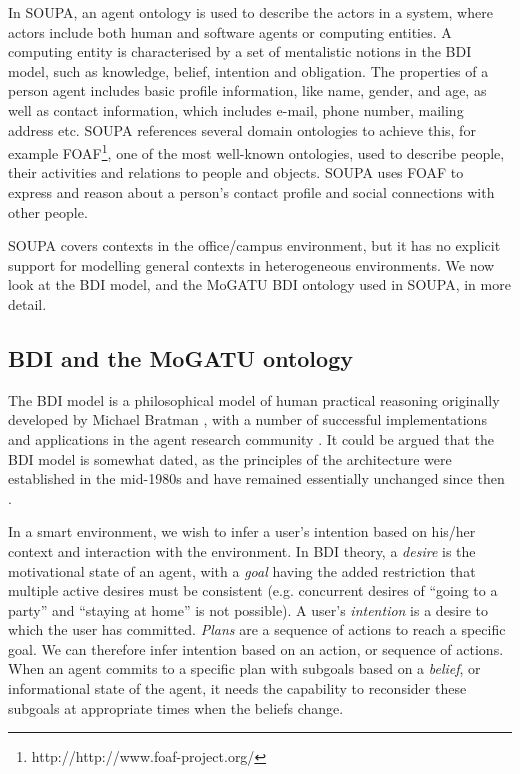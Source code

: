 In \ac{SOUPA}, an agent ontology is used to describe the actors in a system, where actors include both human and software agents or computing entities. A computing entity is characterised by a set of mentalistic notions in the \ac{BDI} model, such as knowledge, belief, intention and obligation. The properties of a person agent includes basic profile information, like name, gender, and age, as well as contact information, which includes e-mail, phone number, mailing address etc. \ac{SOUPA} references several domain ontologies to achieve this, for example \ac{FOAF}\footnote{http://http://www.foaf-project.org/}, one of the most well-known ontologies, used to describe people, their activities and relations to people and objects. \ac{SOUPA} uses \ac{FOAF} to express and reason about a person's contact profile and social connections with other people.

\ac{SOUPA} covers contexts in the office/campus environment, but it has no explicit support for modelling general contexts in heterogeneous environments. We now look at the \ac{BDI} model, and the MoGATU \ac{BDI} ontology used in \ac{SOUPA}, in more detail.
\subsection{BDI and the MoGATU ontology}

The \ac{BDI} model is a philosophical model of human practical reasoning originally developed by Michael Bratman \cite{Bratman1987}, with a number of successful implementations and applications in the agent research community \cite{Bratman1988, Georgeff1996}. It could be argued that the \ac{BDI} model is somewhat dated, as the principles of the architecture were established in the mid-1980s and have remained essentially unchanged since then \cite{Georgeff1999}. 

In a smart environment, we wish to infer a user's intention based on his/her context and interaction with the environment. In \ac{BDI} theory, a \emph{desire} is the motivational state of an agent, with a \emph{goal} having the added restriction that multiple active desires must be consistent (e.g. concurrent desires of ``going to a party'' and ``staying at home'' is not possible). A user's \emph{intention} is a desire to which the user has committed. \emph{Plans} are a sequence of actions to reach a specific goal. We can therefore infer intention based on an action, or sequence of actions. When an agent commits to a specific plan with subgoals based on a \emph{belief}, or informational state of the agent, it needs the capability to reconsider these subgoals at appropriate times when the beliefs change.%

